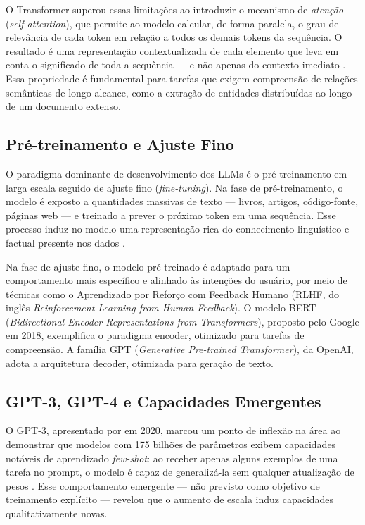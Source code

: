 \documentclass[tcc,capa]{texifsul}
\begin{document}
O Transformer superou essas limitações ao introduzir o mecanismo de \textit{atenção} (\textit{self-attention}), que permite ao modelo calcular, de forma paralela, o grau de relevância de cada token em relação a todos os demais tokens da sequência. O resultado é uma representação contextualizada de cada elemento que leva em conta o significado de toda a sequência — e não apenas do contexto imediato \cite{Vaswani2017}. Essa propriedade é fundamental para tarefas que exigem compreensão de relações semânticas de longo alcance, como a extração de entidades distribuídas ao longo de um documento extenso.

\subsection*{Pré-treinamento e Ajuste Fino}

O paradigma dominante de desenvolvimento dos LLMs é o pré-treinamento em larga escala seguido de ajuste fino (\textit{fine-tuning}). Na fase de pré-treinamento, o modelo é exposto a quantidades massivas de texto — livros, artigos, código-fonte, páginas web — e treinado a prever o próximo token em uma sequência. Esse processo induz no modelo uma representação rica do conhecimento linguístico e factual presente nos dados \cite{Brown2020}.

Na fase de ajuste fino, o modelo pré-treinado é adaptado para um comportamento mais específico e alinhado às intenções do usuário, por meio de técnicas como o Aprendizado por Reforço com Feedback Humano (RLHF, do inglês \textit{Reinforcement Learning from Human Feedback}). O modelo BERT (\textit{Bidirectional Encoder Representations from Transformers}), proposto pelo Google em 2018, exemplifica o paradigma encoder, otimizado para tarefas de compreensão. A família GPT (\textit{Generative Pre-trained Transformer}), da OpenAI, adota a arquitetura decoder, otimizada para geração de texto.

\subsection*{GPT-3, GPT-4 e Capacidades Emergentes}

O GPT-3, apresentado por \citeauthor{Brown2020} em 2020, marcou um ponto de inflexão na área ao demonstrar que modelos com 175 bilhões de parâmetros exibem capacidades notáveis de aprendizado \textit{few-shot}: ao receber apenas alguns exemplos de uma tarefa no prompt, o modelo é capaz de generalizá-la sem qualquer atualização de pesos \cite{Brown2020}. Esse comportamento emergente — não previsto como objetivo de treinamento explícito — revelou que o aumento de escala induz capacidades qualitativamente novas.
\end{document}
